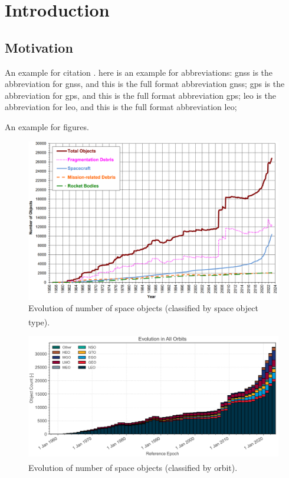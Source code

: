 \chapter{Introduction}\label{ch:intro}
    \section{Motivation}\label{sec:motiv}
        An example for citation \cite{Hinks2013}. here is an example for abbreviations: \acrshort{gnss} is the abbreviation for \acrlong{gnss}, and this is the full format abbreviation \acrfull{gnss}; \acrshort{gps} is the abbreviation for \acrlong{gps}, and this is the full format abbreviation \acrfull{gps}; \acrshort{leo} is the abbreviation for \acrlong{leo}, and this is the full format abbreviation \acrfull{leo}; 
        
        \lipsum[1]

        An example for figures. 
        \begin{figure}[!ht]
            \centering
            \includegraphics[width=1.0\textwidth]{figures/evo_typ.png}
            \caption{Evolution of number of space objects
            (classified by space object type)\textsuperscript{\cite{nasa2023}}.}\label{fig:evo_typ}
        \end{figure}
        \begin{figure}[!ht]
            \centering
            \includegraphics[width=1.0\textwidth]{figures/evo_orb.png}
            \caption{Evolution of number of space objects
            (classified by orbit)\textsuperscript{\cite{esa2023}}.}\label{fig:evo_orb}
        \end{figure}

